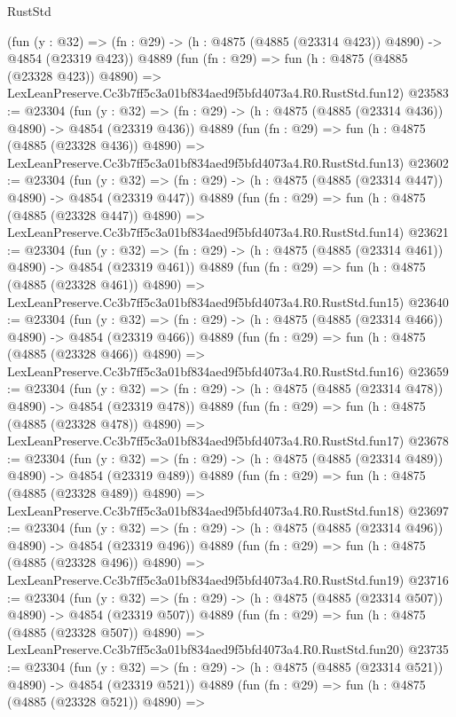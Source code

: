 \begin{lexlean}{RustStd}
\begin{coremodule}
    (fun (y : @32) => (fn : @29) -> (h : @4875 (@4885 (@23314 @423)) @4890) -> @4854 (@23319 @423))
    @4889
    (fun (fn : @29) =>
    fun (h : @4875 (@4885 (@23328 @423)) @4890) =>
    LexLeanPreserve.Cc3b7ff5c3a01bf834aed9f5bfd4073a4.R0.RustStd.fun12)
@23583 := @23304
    (fun (y : @32) => (fn : @29) -> (h : @4875 (@4885 (@23314 @436)) @4890) -> @4854 (@23319 @436))
    @4889
    (fun (fn : @29) =>
    fun (h : @4875 (@4885 (@23328 @436)) @4890) =>
    LexLeanPreserve.Cc3b7ff5c3a01bf834aed9f5bfd4073a4.R0.RustStd.fun13)
@23602 := @23304
    (fun (y : @32) => (fn : @29) -> (h : @4875 (@4885 (@23314 @447)) @4890) -> @4854 (@23319 @447))
    @4889
    (fun (fn : @29) =>
    fun (h : @4875 (@4885 (@23328 @447)) @4890) =>
    LexLeanPreserve.Cc3b7ff5c3a01bf834aed9f5bfd4073a4.R0.RustStd.fun14)
@23621 := @23304
    (fun (y : @32) => (fn : @29) -> (h : @4875 (@4885 (@23314 @461)) @4890) -> @4854 (@23319 @461))
    @4889
    (fun (fn : @29) =>
    fun (h : @4875 (@4885 (@23328 @461)) @4890) =>
    LexLeanPreserve.Cc3b7ff5c3a01bf834aed9f5bfd4073a4.R0.RustStd.fun15)
@23640 := @23304
    (fun (y : @32) => (fn : @29) -> (h : @4875 (@4885 (@23314 @466)) @4890) -> @4854 (@23319 @466))
    @4889
    (fun (fn : @29) =>
    fun (h : @4875 (@4885 (@23328 @466)) @4890) =>
    LexLeanPreserve.Cc3b7ff5c3a01bf834aed9f5bfd4073a4.R0.RustStd.fun16)
@23659 := @23304
    (fun (y : @32) => (fn : @29) -> (h : @4875 (@4885 (@23314 @478)) @4890) -> @4854 (@23319 @478))
    @4889
    (fun (fn : @29) =>
    fun (h : @4875 (@4885 (@23328 @478)) @4890) =>
    LexLeanPreserve.Cc3b7ff5c3a01bf834aed9f5bfd4073a4.R0.RustStd.fun17)
@23678 := @23304
    (fun (y : @32) => (fn : @29) -> (h : @4875 (@4885 (@23314 @489)) @4890) -> @4854 (@23319 @489))
    @4889
    (fun (fn : @29) =>
    fun (h : @4875 (@4885 (@23328 @489)) @4890) =>
    LexLeanPreserve.Cc3b7ff5c3a01bf834aed9f5bfd4073a4.R0.RustStd.fun18)
@23697 := @23304
    (fun (y : @32) => (fn : @29) -> (h : @4875 (@4885 (@23314 @496)) @4890) -> @4854 (@23319 @496))
    @4889
    (fun (fn : @29) =>
    fun (h : @4875 (@4885 (@23328 @496)) @4890) =>
    LexLeanPreserve.Cc3b7ff5c3a01bf834aed9f5bfd4073a4.R0.RustStd.fun19)
@23716 := @23304
    (fun (y : @32) => (fn : @29) -> (h : @4875 (@4885 (@23314 @507)) @4890) -> @4854 (@23319 @507))
    @4889
    (fun (fn : @29) =>
    fun (h : @4875 (@4885 (@23328 @507)) @4890) =>
    LexLeanPreserve.Cc3b7ff5c3a01bf834aed9f5bfd4073a4.R0.RustStd.fun20)
@23735 := @23304
    (fun (y : @32) => (fn : @29) -> (h : @4875 (@4885 (@23314 @521)) @4890) -> @4854 (@23319 @521))
    @4889
    (fun (fn : @29) =>
    fun (h : @4875 (@4885 (@23328 @521)) @4890) =>

\end{coremodule}
\end{lexlean}
